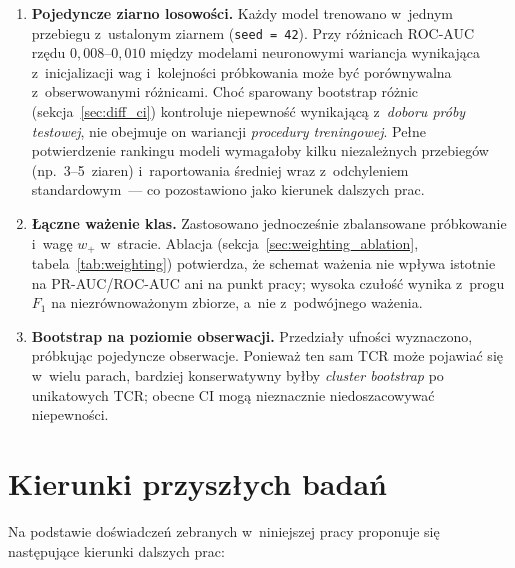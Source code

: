 \documentclass{SGGW-thesis}
\begin{document}
\begin{enumerate}
  \item \textbf{Pojedyncze ziarno losowości.} Każdy model trenowano w~jednym przebiegu z~ustalonym
        ziarnem (\texttt{seed = 42}). Przy różnicach ROC-AUC rzędu $0{,}008$--$0{,}010$ między
        modelami neuronowymi wariancja wynikająca z~inicjalizacji wag i~kolejności próbkowania
        może być porównywalna z~obserwowanymi różnicami. Choć sparowany bootstrap różnic
        (sekcja~\ref{sec:diff_ci}) kontroluje niepewność wynikającą z~\textit{doboru próby
        testowej}, nie obejmuje on wariancji \textit{procedury treningowej}. Pełne potwierdzenie
        rankingu modeli wymagałoby kilku niezależnych przebiegów (np.\ 3--5~ziaren) i~raportowania
        średniej wraz z~odchyleniem standardowym~--- co pozostawiono jako kierunek dalszych prac.

  \item \textbf{Łączne ważenie klas.} Zastosowano jednocześnie zbalansowane próbkowanie
        i~wagę $w_+$ w~stracie. Ablacja (sekcja~\ref{sec:weighting_ablation},
        tabela~\ref{tab:weighting}) potwierdza, że schemat ważenia nie wpływa istotnie na
        PR-AUC/ROC-AUC ani na punkt pracy; wysoka czułość wynika z~progu $F_1$ na niezrównoważonym
        zbiorze, a~nie z~podwójnego ważenia.

  \item \textbf{Bootstrap na poziomie obserwacji.} Przedziały ufności wyznaczono, próbkując
        pojedyncze obserwacje. Ponieważ ten sam TCR może pojawiać się w~wielu parach, bardziej
        konserwatywny byłby \emph{cluster bootstrap} po unikatowych TCR; obecne CI mogą
        nieznacznie niedoszacowywać niepewności.
\end{enumerate}

\section{Kierunki przyszłych badań}

Na podstawie doświadczeń zebranych w~niniejszej pracy proponuje się następujące kierunki dalszych
prac:
\end{document}
